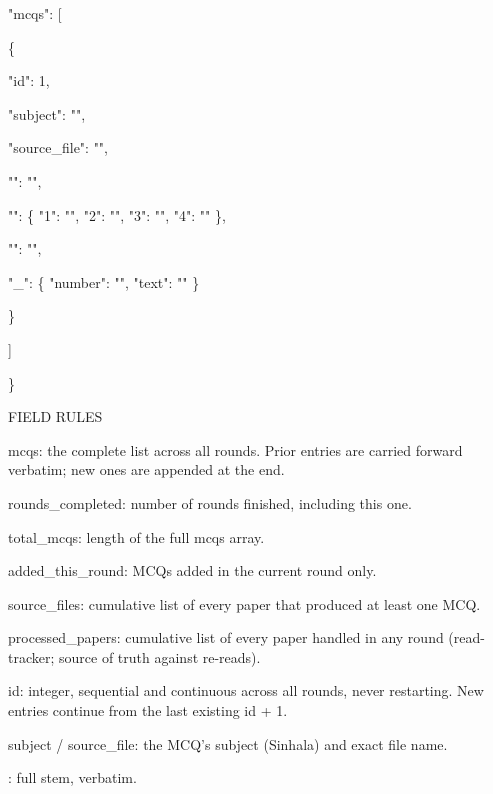 \hspace*{1.0em}"mcqs": [

\hspace*{2.0em}\{

\hspace*{3.0em}"id": 1,

\hspace*{3.0em}"subject": "",

\hspace*{3.0em}"source\_file": "",

\hspace*{3.0em}"": "",

\hspace*{3.0em}"": \{ "1": "", "2": "", "3": "", "4": "" \},

\hspace*{3.0em}"": "",

\hspace*{3.0em}"\_": \{ "number": "", "text": "" \}

\hspace*{2.0em}\}

\hspace*{1.0em}]

\}

\medskip

FIELD RULES

\medskip

mcqs: the complete list across all rounds. Prior entries are carried forward verbatim; new ones are appended at the end.

rounds\_completed: number of rounds finished, including this one.

total\_mcqs: length of the full mcqs array.

added\_this\_round: MCQs added in the current round only.

source\_files: cumulative list of every paper that produced at least one MCQ.

processed\_papers: cumulative list of every paper handled in any round (read-tracker; source of truth against re-reads).

id: integer, sequential and continuous across all rounds, never restarting. New entries continue from the last existing id + 1.

subject / source\_file: the MCQ’s subject (Sinhala) and exact file name.

: full stem, verbatim.


